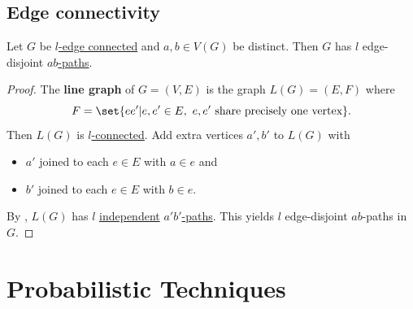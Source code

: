 \documentclass{article}
\begin{document}
\subsection{Edge connectivity}
\begin{ncor}\label{cor:36}
    Let $G$ be \hyperlink{def:lConn}{$l$-edge connected} and $a,b \in V(G)$ be distinct.
    Then $G$ has $l$ edge-disjoint \hyperlink{def:abpath}{$ab$-paths}.
\end{ncor}
\begin{proof}
    The \hypertarget{def:linegraph}{\textbf{line graph}} of $G=(V,E)$ is the graph $L(G) = (E,F)$ where
    \begin{equation*}
        F = \set{ee' | e,e' \in E,\ e,e' \text{ share precisely one vertex}}.
    \end{equation*}
    Then $L(G)$ is \hyperlink{def:kConn}{$l$-connected}.
    Add extra vertices $a',b'$ to $L(G)$ with
    \begin{itemize}
        \item $a'$ joined to each $e \in E$ with $a \in e$ and
        \item $b'$ joined to each $e \in E$ with $b \in e$.
    \end{itemize}

    By , $L(G)$ has $l$ \hyperlink{def:indepPath}{independent} \hyperlink{def:abpath}{$a'b'$-paths}.
    This yields $l$ edge-disjoint $ab$-paths in $G$.
\end{proof}

\clearpage
\section{Probabilistic Techniques}
\end{document}
